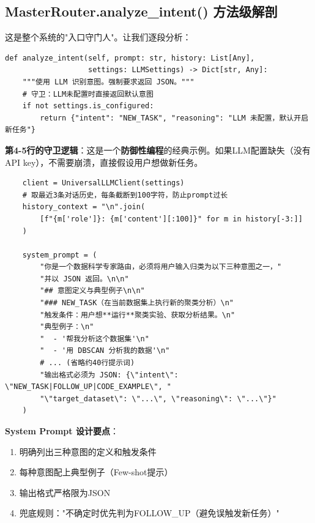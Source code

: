 \documentclass[11pt,a4paper]{ctexbook}
\begin{document}
\subsection{MasterRouter.analyze\_intent() 方法级解剖}

这是整个系统的"入口守门人"。让我们逐段分析：

\begin{verbatim}
def analyze_intent(self, prompt: str, history: List[Any],
                   settings: LLMSettings) -> Dict[str, Any]:
    """使用 LLM 识别意图。强制要求返回 JSON。"""
    # 守卫：LLM未配置时直接返回默认意图
    if not settings.is_configured:
        return {"intent": "NEW_TASK", "reasoning": "LLM 未配置，默认开启新任务"}
\end{verbatim}

\textbf{第4-5行的守卫逻辑}：这是一个\textbf{防御性编程}的经典示例。如果LLM配置缺失（没有API key），不需要崩溃，直接假设用户想做新任务。

\begin{verbatim}
    client = UniversalLLMClient(settings)
    # 取最近3条对话历史，每条截断到100字符，防止prompt过长
    history_context = "\n".join(
        [f"{m['role']}: {m['content'][:100]}" for m in history[-3:]]
    )

    system_prompt = (
        "你是一个数据科学专家路由，必须将用户输入归类为以下三种意图之一，"
        "并以 JSON 返回。\n\n"
        "## 意图定义与典型例子\n\n"
        "### NEW_TASK（在当前数据集上执行新的聚类分析）\n"
        "触发条件：用户想**运行**聚类实验、获取分析结果。\n"
        "典型例子：\n"
        "  - '帮我分析这个数据集'\n"
        "  - '用 DBSCAN 分析我的数据'\n"
        # ... (省略约40行提示词)
        "输出格式必须为 JSON: {\"intent\": \"NEW_TASK|FOLLOW_UP|CODE_EXAMPLE\", "
        "\"target_dataset\": \"...\", \"reasoning\": \"...\"}"
    )
\end{verbatim}

\textbf{System Prompt 设计要点}：
\begin{enumerate}
    \item 明确列出三种意图的定义和触发条件
    \item 每种意图配上典型例子（Few-shot提示）
    \item 输出格式严格限为JSON
    \item 兜底规则："不确定时优先判为FOLLOW\_UP（避免误触发新任务）"
\end{enumerate}
\end{document}
